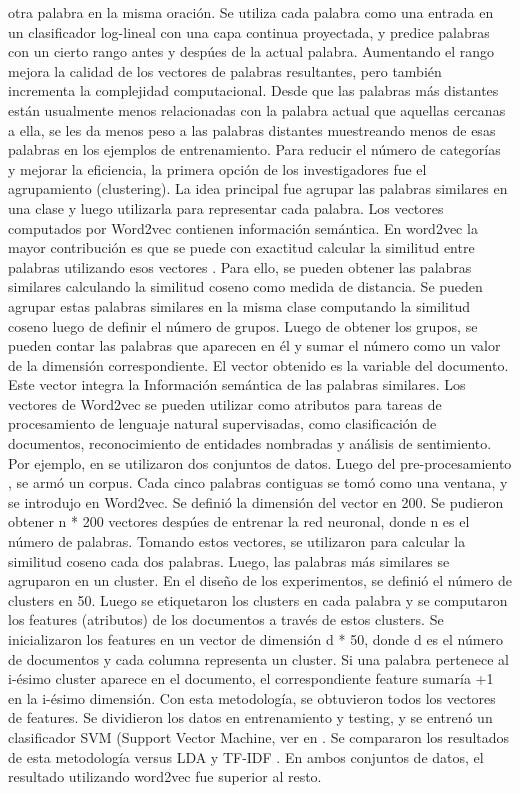 otra palabra en la misma oración. Se utiliza cada palabra como una entrada en un
clasificador log-lineal con una capa continua proyectada, y predice palabras con un
cierto rango antes y despúes de la actual palabra.
Aumentando el rango mejora la calidad de los vectores de palabras resultantes, pero
también incrementa la complejidad computacional. Desde que las palabras más distantes
están usualmente menos relacionadas con la palabra actual que aquellas cercanas a
ella, se les da menos peso a las palabras distantes muestreando menos de esas palabras
en los ejemplos de entrenamiento.
Para reducir el número de categorías y mejorar la eficiencia, la primera opción de
los investigadores fue el agrupamiento (clustering). La idea principal fue agrupar las
palabras similares en una clase y luego utilizarla para representar cada palabra. Los
vectores computados por Word2vec contienen información semántica. En word2vec la
mayor contribución es que se puede con exactitud calcular la similitud entre palabras
utilizando esos vectores \cite{yuan2014new}. 
Para ello, se pueden obtener las palabras similares calculando la similitud coseno
como medida de distancia. Se pueden agrupar estas palabras similares en la misma
clase computando la similitud coseno luego de definir el número de grupos. Luego de
obtener los grupos, se pueden contar las palabras que aparecen en él y sumar el número
como un valor de la dimensión correspondiente. El vector obtenido es la variable del
documento. Este vector integra la Información semántica de las palabras similares. Los
vectores de Word2vec se pueden utilizar como atributos para tareas de procesamiento
de lenguaje natural supervisadas, como clasificación de documentos, reconocimiento de
entidades nombradas y análisis de sentimiento.
Por ejemplo, en \cite{yuan2014new} se utilizaron dos conjuntos de datos. Luego del
pre-procesamiento , se armó un corpus.
Cada cinco palabras contiguas se tomó como una ventana, y se introdujo en
Word2vec. Se definió la dimensión del vector en 200. Se pudieron obtener n * 200
vectores despúes de entrenar la red neuronal, donde n es el número de palabras. Tomando
estos vectores, se utilizaron para calcular la similitud coseno cada dos palabras.
Luego, las palabras más similares se agruparon en un cluster. En el diseño de los experimentos,
se definió el número de clusters en 50. Luego se etiquetaron los clusters en cada
palabra y se computaron los features (atributos) de los documentos a través de estos
clusters. Se inicializaron los features en un vector de dimensión d * 50, donde d es el
número de documentos y cada columna representa un cluster. Si una palabra pertenece
al i-ésimo cluster aparece en el documento, el correspondiente feature sumaría +1 en
la i-ésimo dimensión. Con esta metodología, se obtuvieron todos los vectores de features.
Se dividieron los datos en entrenamiento y testing, y se entrenó  un clasificador SVM
(Support Vector Machine, ver en \cite{tong2001support}. Se compararon los resultados
de esta metodología versus LDA y TF-IDF . En ambos conjuntos de
datos, el resultado utilizando word2vec fue superior al resto.

